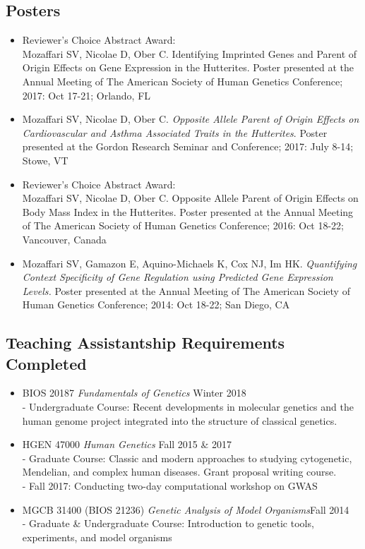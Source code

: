 \documentclass[a4paper, 11pt]{article}
\begin{document}
\subsection*{Posters}
\begin{itemize}
    \item Reviewer's Choice Abstract Award: \\Mozaffari SV, Nicolae D, Ober C. Identifying Imprinted Genes and Parent of Origin Effects on Gene Expression in the Hutterites. Poster presented at the Annual Meeting of The American Society of Human Genetics Conference; 2017: Oct 17-21; Orlando, FL
    \item Mozaffari SV, Nicolae D, Ober C. \emph{Opposite Allele Parent of Origin Effects on Cardiovascular and Asthma Associated Traits in the Hutterites}. Poster presented at the Gordon Research Seminar and Conference; 2017: July 8-14; Stowe, VT
    \item Reviewer's Choice Abstract Award: \\Mozaffari SV, Nicolae D, Ober C. Opposite Allele Parent of Origin Effects on Body Mass Index in the Hutterites. Poster presented at the Annual Meeting of The American Society of Human Genetics Conference; 2016: Oct 18-22; Vancouver, Canada
    \item Mozaffari SV, Gamazon E, Aquino-Michaels K, Cox NJ, Im HK. \emph{Quantifying Context Specificity of Gene Regulation using Predicted Gene Expression Levels.} Poster presented at the Annual Meeting of The American Society of Human Genetics Conference; 2014: Oct 18-22; San Diego, CA 

\end{itemize}

\subsection*{Teaching Assistantship Requirements Completed}
\begin{itemize}
	\item BIOS 20187 \emph{Fundamentals of Genetics} \hfill Winter 2018\\
		- Undergraduate Course: Recent developments in molecular genetics and the human genome project integrated into the structure of classical genetics.
	\item HGEN 47000 \emph{Human Genetics} \hfill Fall 2015 \& 2017\\
- Graduate Course: Classic and modern approaches to studying cytogenetic, Mendelian, and complex human diseases. Grant proposal writing course. \\ - Fall 2017: Conducting two-day computational workshop on GWAS
    \item MGCB 31400 (BIOS 21236) \emph{Genetic Analysis of Model Organisms}\hfill Fall 2014\\
- Graduate \& Undergraduate Course: Introduction to genetic tools, experiments, and model organisms 
\end{itemize}
\end{document}
